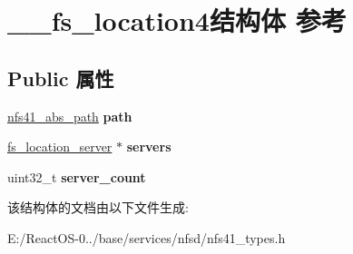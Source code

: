 \hypertarget{struct____fs__location4}{}\section{\+\_\+\+\_\+fs\+\_\+location4结构体 参考}
\label{struct____fs__location4}
\subsection*{Public 属性}
\begin{DoxyCompactItemize}
\item 
\mbox{\label{struct____fs__location4_a52a94b72098896408f54b5e8bd031b94}} 
\hyperlink{struct____nfs41__abs__path}{nfs41\+\_\+abs\+\_\+path} {\bfseries path}
\item 
\mbox{\label{struct____fs__location4_aeadb634703393273271c1f093def7f74}} 
\hyperlink{struct____fs__location__server}{fs\+\_\+location\+\_\+server} $\ast$ {\bfseries servers}
\item 
\mbox{\label{struct____fs__location4_ac86dda743344467de34ae9a948b76191}} 
uint32\+\_\+t {\bfseries server\+\_\+count}
\end{DoxyCompactItemize}


该结构体的文档由以下文件生成\+:\begin{DoxyCompactItemize}
\item 
E\+:/\+React\+O\+S-\/0../base/services/nfsd/nfs41\+\_\+types.\+h\end{DoxyCompactItemize}
